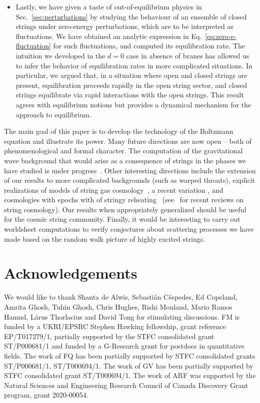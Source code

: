 \documentclass[a4paper,11pt]{article}
\begin{document}
{{{{{{{{{{{{\begin{itemize}
\item Lastly, we have given a taste of out-of-equilibrium physics in Sec.~\ref{sec:perturbations} by studying the behaviour of an ensemble of closed strings under zero-energy perturbations, which are to be interpreted as fluctuations.
    We have obtained an analytic expression in Eq.~\eqref{eq:zero-e-fluctuation} for such fluctuations, and computed its equilibration rate.
    The intuition we developed in the $d=0$ case in absence of branes has allowed us to infer the behavior of equilibration rates in more complicated situations.
    In particular, we argued that, in a situation where open and closed strings are present, equilibration proceeds rapidly in the open string sector, and closed strings equilibrate via rapid interactions with the open strings.
    This result agrees with equilibrium notions but provides a dynamical mechanism for the approach to equilibrium.
\end{itemize}

The main goal of this paper is to develop the technology of the Boltzmann equation and illustrate its power.
Many future directions are now open -- both of  phenomenological and formal character.
The computation of the gravitational wave background that would arise as a consequence of strings in the phases we have studied is under progress~\cite{Frey:2024in}.
Other interesting directions include the  extension of our results to more complicated backgrounds (such as warped throats), explicit realizations of models of string gas cosmology~\cite{Brandenberger:1988aj, Brandenberger:2006vv, Brandenberger:2006xi, Nayeri:2005ck}, a recent variation \cite{Melcher:2023kpd}, and cosmologies
with epochs with of stringy reheating~\cite{Frey:2005jk, DiMarco:2019czi,Apers:2022cyl,Conlon:2022pnx}
(see~\cite{Cicoli:2023opf, Brandenberger:2023ver} for recent reviews on string cosmology).
Our results when appropriately generalized  should be useful  for the cosmic string community. Finally, it would be interesting to carry out worldsheet computations to verify conjectures about scattering processes we have made based on the random walk picture of highly excited strings.

\section*{Acknowledgements}

We would like to thank Shanta de Alwis, Sebastián Céspedes, Ed Copeland, Amrita Ghosh, Tuhin Ghosh, Chris Hughes, Rishi Mouland, Mario Ramos Hamud, Lárus Thorlacius and David Tong for stimulating discussions.
FM is funded by a UKRI/EPSRC Stephen Hawking fellowship, grant reference EP/T017279/1, partially supported by the STFC consolidated grant ST/P000681/1 and funded by a G-Research grant for postdocs in quantitative fields.
 The work of FQ has been partially supported by STFC consolidated grants ST/P000681/1, ST/T000694/1. The work of GV has been partially supported by STFC consolidated grant ST/T000694/1. The work of ARF was supported by the Natural Sciences and Engineering Research Council of Canada Discovery Grant program, grant 2020-00054. 

}}}}}}}}}}}}
\end{document}

